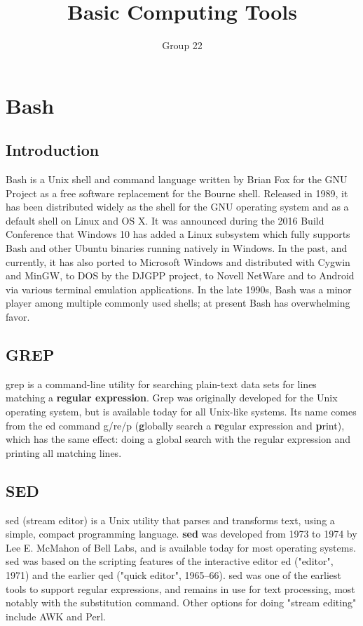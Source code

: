 \documentclass{article}
\author{ Group 22 }
\date{}
\title{Basic Computing Tools}
\begin{document}
	
	\maketitle
	
	\section{Bash}
        \subsection{Introduction}
Bash is a Unix shell and command language written by Brian Fox for the GNU Project as a free software replacement for the Bourne shell. Released in 1989, it has been distributed widely as the shell for the GNU operating system and as a default shell on Linux and OS X. It was announced during the 2016 Build Conference that Windows 10 has added a Linux subsystem which fully supports Bash and other Ubuntu binaries running natively in Windows. In the past, and currently, it has also ported to Microsoft Windows and distributed with Cygwin and MinGW, to DOS by the DJGPP project, to Novell NetWare and to Android via various terminal emulation applications. In the late 1990s, Bash was a minor player among multiple commonly used shells; at present Bash has overwhelming favor.
    \subsection{GREP}
    grep is a command-line utility for searching plain-text data sets for lines matching a \textbf{regular expression}. Grep was originally developed for the Unix operating system, but is available today for all Unix-like systems. Its name comes from the ed command g/re/p (\textbf{g}lobally search a \textbf{re}gular expression and \textbf{p}rint), which has the same effect: doing a global search with the regular expression and printing all matching lines.
        \subsection{SED}
    sed (stream editor) is a Unix utility that parses and transforms text, using a simple, compact programming language. \textbf{sed} was developed from 1973 to 1974 by Lee E. McMahon of Bell Labs, and is available today for most operating systems. sed was based on the scripting features of the interactive editor ed ("editor", 1971) and the earlier qed ("quick editor", 1965–66). sed was one of the earliest tools to support regular expressions, and remains in use for text processing, most notably with the substitution command. Other options for doing "stream editing" include AWK and Perl.
\end{document}

